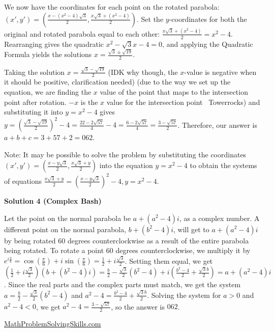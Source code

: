 \begin{enumerate}
 
We now have the coordinates for each point on the rotated parabola: $(x',y')=\left(\frac{x-(x^2-4)\sqrt{3}}{2}, \frac{x\sqrt{3}+(x^2-4)}{2}\right)$. Set the $y$-coordinates for both the original and rotated parabola equal to each other: $\frac{x\sqrt{3}+(x^2-4)}{2}=x^2-4$. Rearranging gives the quadratic $x^2-\sqrt{3}x-4=0$, and applying the Quadratic Formula yields the solutions $x=\frac{\sqrt{3}\pm\sqrt{19}}{2}$. 

 
Taking the solution $x=\frac{\sqrt{3}-\sqrt{19}}{2}$ (IDK why though, the $x$-value is negative when it should be positive, clarification needed) (due to the way we set up the equation, we are finding the $x$ value of the point that maps to the intersection point after rotation. $-x$ is the $x$ value for the intersection point ~Towerrocks)  and substituting it into $y=x^2-4$ gives $y=\left(\frac{\sqrt{3}-\sqrt{19}}{2}\right)^2-4=\frac{22-2\sqrt{57}}{4}-4=\frac{6-2\sqrt{57}}{4}=\frac{3-\sqrt{57}}{2}$. Therefore, our answer is $a+b+c=3+57+2=\boxed{062}$.

 


 Note: It may be possible to solve the problem by substituting the coordinates $(x',y')=\left(\frac{x-y\sqrt{3}}{2}, \frac{x\sqrt{3}+y}{2}\right)$ into the equation $y=x^2-4$ to obtain the systems of equations $\frac{x\sqrt{3}+y}{2}=\left(\frac{x-y\sqrt{3}}{2}\right)^2-4, y=x^2-4$.

 



\textbf{Solution 4 (Complex Bash)}

Let the point on the normal parabola be $a+(a^2-4)i$, as a complex number. A different point on the normal parabola, $b+(b^2-4)i$, will get to $a+(a^2-4)i$ by being rotated $60$ degrees counterclockwise as a result of the entire parabola being rotated. To rotate a point $60$ degrees counterclockwise, we multiply it by $e^{i \frac{\pi}{6}} = \cos(\frac{\pi}{6}) + i \sin(\frac{\pi}{6}) = \frac{1}{2} + i \frac{\sqrt{3}}{2}$. Setting them equal, we get $(\frac{1}{2} + i \frac{\sqrt{3}}{2})(b+(b^2-4)i) = \frac{b}{2} - \frac{\sqrt{3}}{2} (b^2-4) + i(\frac{b^2-4}{2} + \frac{\sqrt{3} b}{2})= a + (a^2-4)i$. Since the real parts and the complex parts must match, we get the system $a = \frac{b}{2} - \frac{\sqrt{3}}{2} (b^2-4)$ and $a^2-4 = \frac{b^2-4}{2} + \frac{\sqrt{3} b}{2}$. Solving the system for $a > 0$ and $a^2-4<0$, we get $a^2-4=\frac{3-\sqrt{57}}{2}$, so the answer is $\boxed{062}$. 

 \href{https://mathproblemsolvingskills.wordpress.com/}{MathProblemSolvingSkills.com}


\end{enumerate}
